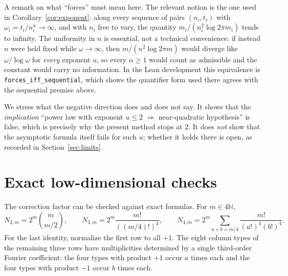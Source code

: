 \documentclass[11pt,reqno]{amsart}
\theoremstyle{plain}
\theoremstyle{definition}
\theoremstyle{remark}
\newcommand{\N}{\mathbb N}
\begin{document}
A remark on what ``forces'' must mean here. The relevant notion is the one used
in Corollary~\ref{cor:exponent}: along every sequence of pairs \((n_i,t_i)\)
with \(\omega_i=t_i/n_i^u\to\infty\), and with \(n_i\) free to vary, the
quantity \(m_i/(n_i^2\log2\pi m_i)\) tends to infinity. The uniformity in \(n\)
is essential, not a technical convenience: if instead \(n\) were held fixed
while \(\omega\to\infty\), then \(m/(n^2\log2\pi m)\) would diverge like
\(\omega/\log\omega\) for \emph{every} exponent \(u\), so every \(\alpha\ge1\)
would count as admissible and the constant would carry no information. In the
Lean development this equivalence is
\texttt{forces\_iff\_sequential}, which shows the quantifier form used there
agrees with the sequential premise above.

We stress what the negative direction does and does not say. It shows that the
\emph{implication} ``power law with exponent \(u\le2\) \(\Rightarrow\)
near-quadratic hypothesis'' is false, which is precisely why the present method
stops at \(2\). It does \emph{not} show that the asymptotic formula itself
fails for such \(u\); whether it holds there is open, as recorded in
Section~\ref{sec:limits}.

\section{Exact low-dimensional checks}

The correction factor can be checked against exact formulas. For
\(m\in4\N\),
\[
  N_{2,m}=2^m\binom m{m/2},\qquad
  N_{3,m}=2^m\frac{m!}{((m/4)!)^4},\qquad
  N_{4,m}=2^m\sum_{a+b=m/4}\frac{m!}{(a!)^4(b!)^4}.
\]
For the last identity, normalize the first row to all \(+1\). The eight column
types of the remaining three rows have multiplicities determined by a single
third-order Fourier coefficient: the four types with product \(+1\) occur
\(a\) times each and the four types with product \(-1\) occur \(b\) times each.
\end{document}
